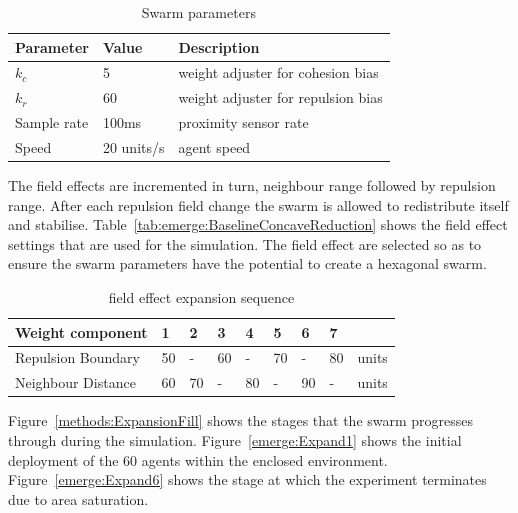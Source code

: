 \begin{table}[H]
\begin{center}
\begin{tabular}{| p{2.5cm} | p{2.0cm} | p{6.0cm} |}
\hline
\bf Parameter & \bf Value  & \bf Description \\ \hline
$k_c$         & 5          & weight adjuster for cohesion bias\\ \hline
$k_r$         & 60         & weight adjuster for repulsion bias\\ \hline
Sample rate   & 100ms      & proximity sensor rate\\ \hline
Speed         & 20 units/s & agent speed\\ \hline
\end{tabular}\caption{Swarm parameters} \label{tab:FillParameters1}
\end{center}
\end{table}

The field effects are incremented in turn, neighbour range followed by repulsion range. After each repulsion field change the swarm is allowed to redistribute itself and stabilise. Table~\ref{tab:emerge:BaselineConcaveReduction} shows the field effect settings that are used for the simulation. The field effect are selected so as to ensure the swarm parameters have the potential to create a hexagonal swarm. 

\begin{table}[H]
\begin{center}
\begin{tabular}{| p{2cm} | p{0.6cm} | p{0.6cm} | p{0.6cm} | p{0.6cm} | p{0.6cm} | p{0.6cm} | p{0.6cm} | p{1cm} |}
\hline
\bf Weight \bf component & \bf 1 & \bf 2 & \bf 3 & \bf 4 & \bf 5 & \bf 6 & \bf 7 & \\ \hline
Repulsion Boundary & 50 & -  & 60 & -  & 70 & -  & 80 & units\\  \hline
Neighbour Distance & 60 & 70 & -  & 80 & -  & 90 & -  & units\\  \hline
\end{tabular}\caption{field effect expansion sequence} \label{tab:FillSequence}
\end{center}
\end{table}

Figure~\ref{methods:ExpansionFill} shows the stages that the swarm progresses through during the simulation. Figure~\ref{emerge:Expand1} shows the initial deployment of the 60 agents within the enclosed environment. Figure~\ref{emerge:Expand6} shows the stage at which the experiment terminates due to area saturation.

